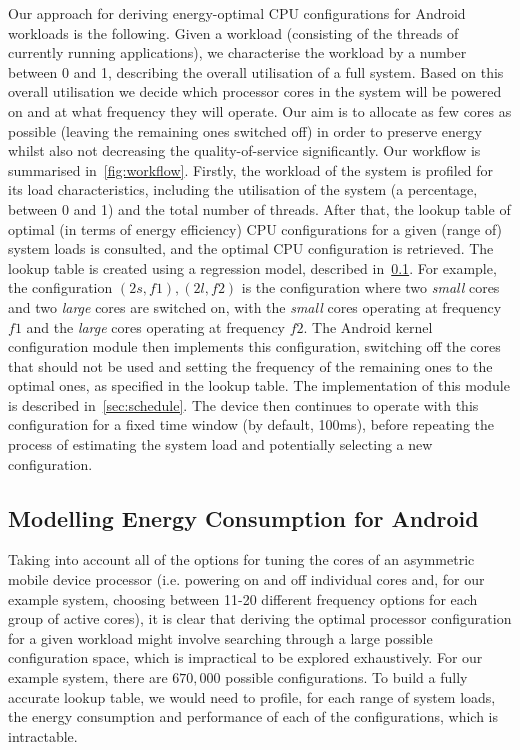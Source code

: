 \documentclass[conference]{IEEEtran}
\begin{document}
Our approach for deriving energy-optimal CPU configurations for Android workloads is the following. Given a workload (consisting of the threads of currently running applications), we characterise the workload by a number between 0 and 1, describing the overall utilisation of a full system. Based on this overall utilisation we decide which processor cores in the system will be powered on and at what frequency they will operate. Our aim is to allocate as few cores as possible (leaving the remaining ones switched off) in order to preserve energy whilst also not decreasing the quality-of-service significantly. Our workflow is summarised in~\cref{fig:workflow}. Firstly, the workload of the system is profiled for its load characteristics, including the utilisation of the system (a percentage, between 0 and 1) and the total number of threads. After that, the lookup table of optimal (in terms of energy efficiency) CPU configurations for a given (range of) system loads is consulted, and the optimal CPU configuration is retrieved. The lookup table is created using a regression model, described in~\cref{sec:model}. For example, the configuration $(2s, f1),(2l, f2)$ is the configuration where two \emph{small} cores and two \emph{large} cores are switched on, with the \emph{small} cores operating at frequency $f1$ and the \emph{large} cores operating at frequency $f2$. The Android kernel configuration module then implements this configuration, switching off the cores that should not be used and setting the frequency of the remaining ones to the optimal ones, as specified in the lookup table. The implementation of this module is described in~\cref{sec:schedule}. The device then continues to operate with this configuration for a fixed time window (by default, 100ms), before repeating the process of estimating the system load and potentially selecting a new configuration.

\subsection{Modelling Energy Consumption for Android} \label{sec:model}


Taking into account all of the options for tuning the cores of an asymmetric mobile device processor (i.e. powering on and off individual cores and, for our example system, choosing between 11-20 different frequency options for each group of active cores), it is clear that deriving the optimal processor configuration for a given workload might involve searching through a large possible configuration space, which is impractical to be explored exhaustively. For our example system, there are $670,000$ possible configurations. To build a fully accurate lookup table, we would need to profile, for each range of system loads, the energy consumption and performance of each of the configurations, which is intractable.  
\end{document}
